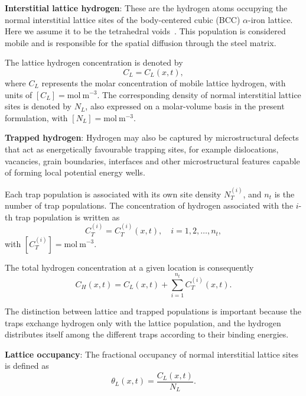 \documentclass[a4paper,12pt,oneside]{report}
\begin{document}
\textbf{Interstitial lattice hydrogen}: These are the hydrogen atoms occupying the normal interstitial lattice sites of the body-centered cubic (BCC) $\alpha$-iron lattice. Here we assume it to be the tetrahedral voids~\cite{KIUCHI1983961}. This population is considered mobile and is responsible for the spatial diffusion through the steel matrix.

The lattice hydrogen concentration is denoted by
\begin{equation}
C_L = C_L(x, t),
\label{eq:ch3_CL}
\end{equation}
where $C_L$ represents the molar concentration of mobile lattice hydrogen, with units of $[C_L] = \mathrm{mol~m^{-3}}$. The corresponding density of normal interstitial lattice sites is denoted by $N_L$, also expressed on a molar-volume basis in the present formulation, with $[N_L] = \mathrm{mol~m^{-3}}$.

\textbf{Trapped hydrogen}: Hydrogen may also be captured by microstructural defects that act as energetically favourable trapping sites, for example dislocations, vacancies, grain boundaries, interfaces and other microstructural features capable of forming local potential energy wells.

Each trap population is associated with its own site density $N_T^{(i)}$, and $n_t$ is the number of trap populations. The concentration of hydrogen associated with the $i$-th trap population is written as
\begin{equation}
C^{(i)}_T = C^{(i)}_T(x, t), \quad i = 1, 2, \dots , n_t,
\label{eq:ch3_CT}
\end{equation}
with $[C^{(i)}_T] = \mathrm{mol~m^{-3}}$.

The total hydrogen concentration at a given location is consequently
\begin{equation}
C_H(x, t) = C_L(x, t) + \sum_{i=1}^{n_t} C^{(i)}_T(x, t).
\label{eq:ch3_CH}
\end{equation}

The distinction between lattice and trapped populations is important because the traps exchange hydrogen only with the lattice population, and the hydrogen distributes itself among the different traps according to their binding energies.

\textbf{Lattice occupancy}: The fractional occupancy of normal interstitial lattice sites is defined as
\begin{equation}
\theta_L(x, t) = \frac{C_L(x, t)}{N_L}.
\label{eq:ch3_thetaL}
\end{equation}
\end{document}
